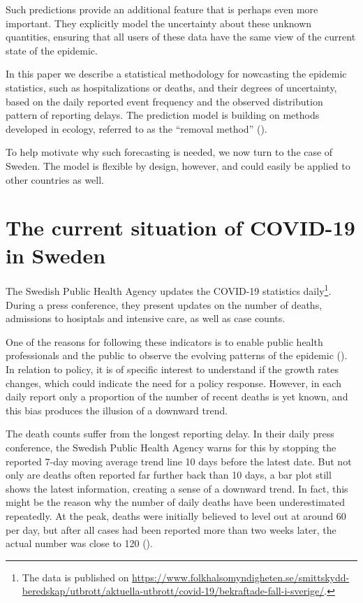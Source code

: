 \documentclass[a4paper,11pt,article,oneside,openany,american]{memoir}
\begin{document}
Such predictions provide an additional feature that is perhaps even more important. They explicitly model the uncertainty about these unknown quantities, ensuring that all users of these data have the same view of the current state of the epidemic.

In this paper we describe a statistical methodology for nowcasting the epidemic statistics, such as hospitalizations or deaths, and their degrees of uncertainty, based on the daily reported event frequency and the observed distribution pattern of reporting delays. The prediction model is building on methods developed in ecology, referred to as the ``removal method'' (\cite{Pollock1991_review_papers}).

To help motivate why such forecasting is needed, we now turn to the case of Sweden. The model is flexible by design, however, and could easily be applied to other countries as well.

\section{The current situation of COVID-19 in Sweden}
The Swedish Public Health Agency updates the COVID-19 statistics daily\footnote{The data is published on \url{https://www.folkhalsomyndigheten.se/smittskydd-beredskap/utbrott/aktuella-utbrott/covid-19/bekraftade-fall-i-sverige/}.}. During a press conference, they present updates on the number of deaths, admissions to hosiptals and intensive care, as well as case counts.

One of the reasons for following these indicators is to enable public health professionals and the public to observe the evolving patterns of the epidemic (\cite{Anderson2020_how_will}). In relation to policy, it is of specific interest to understand if the growth rates changes, which could indicate the need for a policy response. However, in each daily report only a proportion of the number of recent deaths is yet known, and this bias produces the illusion of a downward trend.

The death counts suffer from the longest reporting delay. In their daily press conference, the Swedish Public Health Agency warns for this by stopping the reported 7-day moving average trend line 10 days before the latest date. But not only are deaths often reported far further back than 10 days, a bar plot still shows the latest information, creating a sense of a downward trend. In fact, this might be the reason why the number of daily deaths have been underestimated repeatedly. At the peak, deaths were initially believed to level out at around 60 per day, but after all cases had been reported more than two weeks later, the actual number was close to 120 (\cite{Ohman2020_antalet_virusdoda}).
\end{document}
